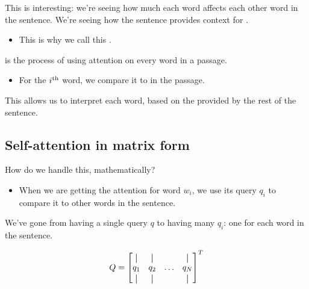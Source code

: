         This is interesting: we're seeing how much each word affects each other word in the sentence. We're seeing how the sentence provides context for .
    
        \begin{itemize}
            \item This is why we call this .\\
        \end{itemize}
    
        \begin{definition}
             is the process of using attention on every word in a passage.
    
            \begin{itemize}
                \item For the $i^{ \text{th} }$ word, we compare it to  in the passage.
            \end{itemize}
    
            This allows us to interpret each word, based on the  provided by the rest of the sentence.
        \end{definition}
    
    

    \subsection{Self-attention in matrix form}

        How do we handle this, mathematically?

        \begin{itemize}
            \item When we are getting the attention for word $w_i$, we use its query $q_i$ to compare it to other words in the sentence.
        \end{itemize}

        We've gone from having a single query $q$ to having many $q_i$: one for each word in the sentence.

        \begin{equation}
            Q = 
            \begin{bmatrix}
                \vertbar & \vertbar  & \     & \vertbar \\
                q_1 & q_2 & \ldots & q_N \\
                \vertbar & \vertbar  &        & \vertbar
            \end{bmatrix}^T
        \end{equation}

